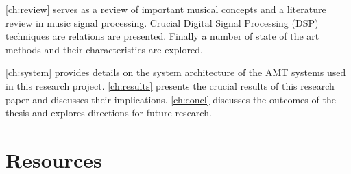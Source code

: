 \autoref{ch:review} serves as a review of important musical concepts and a
literature review in music signal processing. Crucial Digital Signal Processing
(DSP) techniques are relations are presented. Finally a number of state of the
art methods and their characteristics are explored.

\autoref{ch:system} provides details on the system architecture of the AMT
systems used in this research project. \autoref{ch:results} presents the crucial
results of this research paper and discusses their implications.
\autoref{ch:concl} discusses the outcomes of the thesis and explores directions
for future research.

\section{Resources}

